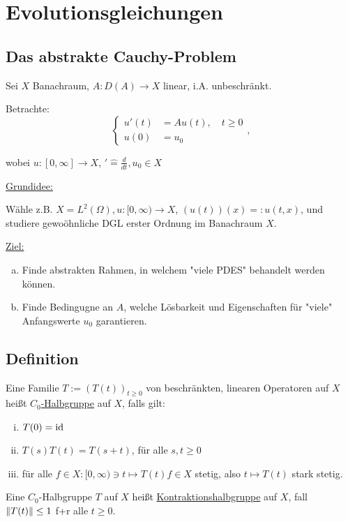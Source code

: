 \section{Evolutionsgleichungen}

\subsection{Das abstrakte Cauchy-Problem}

Sei $X$ Banachraum, $A \colon D(A) \to X$ linear, i.A. unbeschränkt.

Betrachte:
$$
\begin{cases} 
u'(t) &= Au(t), \quad t \geq 0 \\
u(0) &= u_0
\end{cases} , $$

wobei $u \colon [0,\infty] \to X$, $' \hat = \frac{d}{dt}, u_0 \in X$

\underline{Grundidee:}

Wähle z.B. $X = L^2(\Omega), u \colon [0,\infty) \to X$, $(u(t))(x) =: u(t,x)$, und studiere gewoöhnliche DGL erster Ordnung im Banachraum $X$.

\underline{Ziel:}

\begin{enumerate}[a)]
  \item Finde abstrakten Rahmen, in welchem "viele PDES" behandelt werden können.
  \item Finde Bedingugne an $A$, welche Lösbarkeit und Eigenschaften für "viele" Anfangswerte $u_0$ garantieren.
\end{enumerate}

\subsection{Definition}

Eine Familie $T := (T(t))_{t \geq 0}$ von beschränkten, linearen Operatoren auf $X$ heißt \underline{$C_0$-Halbgruppe} auf $X$, falls gilt:
\begin{enumerate}[i)]
  \item $T(0) = \operatorname{id}$
  \item $T(s)T(t) = T(s + t)$, für alle $s,t \geq 0$
  \item für alle $f \in X \colon [0,\infty) \ni t \mapsto T(t) f \in X$ stetig, also $t \mapsto T(t)$ stark stetig.
\end{enumerate}

Eine $C_0$-Halbgruppe $T$ auf $X$ heißt \underline{Kontraktionshalbgruppe} auf $X$, fall $\lVert T(t) \rVert \leq 1$ f+r alle $t \geq 0$.

